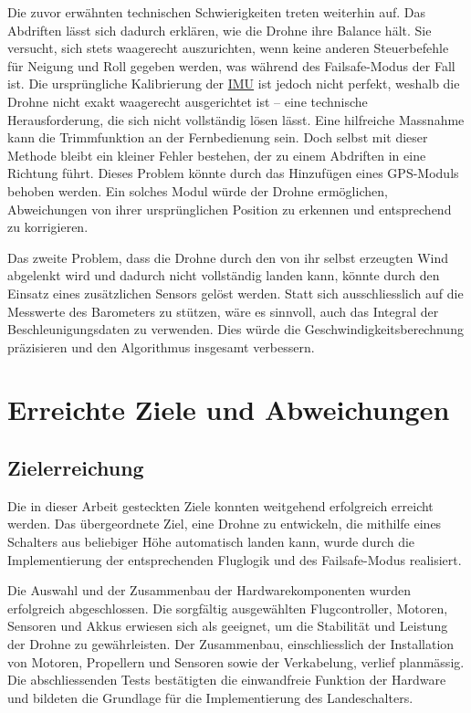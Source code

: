 Die zuvor erwähnten technischen Schwierigkeiten treten weiterhin auf. Das Abdriften lässt sich dadurch erklären, wie die Drohne ihre Balance hält. Sie versucht, sich stets waagerecht auszurichten, wenn keine anderen Steuerbefehle für Neigung und Roll gegeben werden, was während des Failsafe-Modus der Fall ist. Die ursprüngliche Kalibrierung der \hyperref[sec:IMU]{IMU} ist jedoch nicht perfekt, weshalb die Drohne nicht exakt waagerecht ausgerichtet ist – eine technische Herausforderung, die sich nicht vollständig lösen lässt. Eine hilfreiche Massnahme kann die Trimmfunktion an der Fernbedienung sein. Doch selbst mit dieser Methode bleibt ein kleiner Fehler bestehen, der zu einem Abdriften in eine Richtung führt. Dieses Problem könnte durch das Hinzufügen eines GPS-Moduls behoben werden. Ein solches Modul würde der Drohne ermöglichen, Abweichungen von ihrer ursprünglichen Position zu erkennen und entsprechend zu korrigieren.

Das zweite Problem, dass die Drohne durch den von ihr selbst erzeugten Wind abgelenkt wird und dadurch nicht vollständig landen kann, könnte durch den Einsatz eines zusätzlichen Sensors gelöst werden. Statt sich ausschliesslich auf die Messwerte des Barometers zu stützen, wäre es sinnvoll, auch das Integral der Beschleunigungsdaten zu verwenden. Dies würde die Geschwindigkeitsberechnung präzisieren und den Algorithmus insgesamt verbessern. 

\section{Erreichte Ziele und Abweichungen}

\subsection{Zielerreichung}


Die in dieser Arbeit gesteckten Ziele konnten weitgehend erfolgreich erreicht werden. Das übergeordnete Ziel, eine Drohne zu entwickeln, die mithilfe eines Schalters aus beliebiger Höhe automatisch landen kann, wurde durch die Implementierung der entsprechenden Fluglogik und des Failsafe-Modus realisiert.

Die Auswahl und der Zusammenbau der Hardwarekomponenten wurden erfolgreich abgeschlossen. Die sorgfältig ausgewählten Flugcontroller, Motoren, Sensoren und Akkus erwiesen sich als geeignet, um die Stabilität und Leistung der Drohne zu gewährleisten. Der Zusammenbau, einschliesslich der Installation von Motoren, Propellern und Sensoren sowie der Verkabelung, verlief planmässig. Die abschliessenden Tests bestätigten die einwandfreie Funktion der Hardware und bildeten die Grundlage für die Implementierung des Landeschalters.

